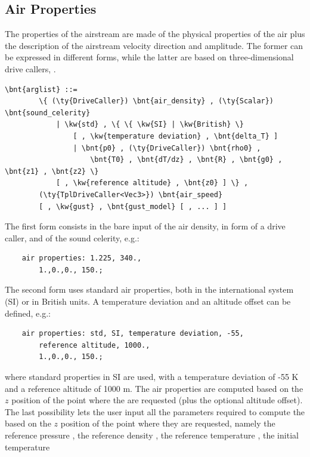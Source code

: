 \subsection{Air Properties}\label{sec:EL:AERO:AIRPROPERTIES}
The properties of the airstream are made of the physical properties
of the air plus the description of the airstream velocity direction
and amplitude.
The former can be expressed in different forms, while the latter
are based on three-dimensional drive callers, .
\begin{Verbatim}[commandchars=\\\{\}]
    \bnt{arglist} ::=
        \{ (\ty{DriveCaller}) \bnt{air_density} , (\ty{Scalar}) \bnt{sound_celerity}
            | \kw{std} , \{ \{ \kw{SI} | \kw{British} \}
                [ , \kw{temperature deviation} , \bnt{delta_T} ]
                | \bnt{p0} , (\ty{DriveCaller}) \bnt{rho0} ,
                    \bnt{T0} , \bnt{dT/dz} , \bnt{R} , \bnt{g0} , \bnt{z1} , \bnt{z2} \}
            [ , \kw{reference altitude} , \bnt{z0} ] \} ,
        (\ty{TplDriveCaller<Vec3>}) \bnt{air_speed}
        [ , \kw{gust} , \bnt{gust_model} [ , ... ] ]
\end{Verbatim}
The first form consists in the bare input of the air density,
in form of a drive caller, and of the sound celerity, e.g.:
\begin{verbatim}
    air properties: 1.225, 340.,
        1.,0.,0., 150.;
\end{verbatim}
The second form uses standard air properties, both in the
international system (SI) or in British units.
A temperature deviation and an altitude offset can be defined, e.g.:
\begin{verbatim}
    air properties: std, SI, temperature deviation, -55,
        reference altitude, 1000.,
        1.,0.,0., 150.;
\end{verbatim}
where standard properties in SI are used, with a temperature
deviation of -55 K and a reference altitude of 1000 m.
The air properties are computed based on the $z$ position of the
point where the  are requested (plus the optional
altitude offset).
The last possibility lets the user input all the parameters
required to compute the  based on the $z$ position
of the point where they are requested, namely the reference
pressure , the reference density ,
the reference temperature , the initial temperature

